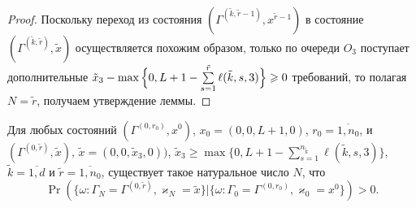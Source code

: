 \documentclass{report}
\begin{document}
\begin{proof}
Поскольку переход из состояния $(\Gamma^{(\tilde{k},\tilde{r}-1)}, x^{\tilde{r}-1})$ в состояние  $(\Gamma^{(\tilde{k},\tilde{r})}, \tilde{x})$ осуществляется похожим образом, только по очереди $O_3$ поступает дополнительные $\tilde{x}_3 \hm- \max{\Bigl\{0,L+1-\sum\limits_{s=1}^{\tilde{r}} \ell(\tilde{k},s,3)\Bigr\}}\geqslant 0$ требований, то полагая $N=\tilde{r}$, получаем утверждение леммы.
\end{proof}


\begin{lemma}
Для любых состояний $(\Gamma^{(0,r_0)},x^0)$, $x_0=(0,0,L+1,0)$, $r_0=\overline{1,n_0}$, и
$(\Gamma^{(0,\tilde{r})},\tilde{x})$,
$\tilde{x}=(0,0,\tilde{x}_3,0))$, $\tilde{x}_3 \geqslant \max{\{0,L+1-\sum_{s=1}^{n_{\tilde{k}}} \ell(\tilde{k},s,3)\}}$,
$\tilde{k}=\overline{1,d}$ и $\tilde{r} = \overline{1,n_0}$, существует такое натуральное число $N$, что 
\begin{equation*}
\Pr(\{\omega\colon \Gamma_{N}=\Gamma^{(0,\tilde{r} )}, \varkappa_{N}=\tilde{x}\}|\{\omega\colon 
\Gamma_{0}=\Gamma^{(0,r_0)}, \varkappa_{0}=x^0\})>0.
\end{equation*}
\end{lemma}
\end{document}
